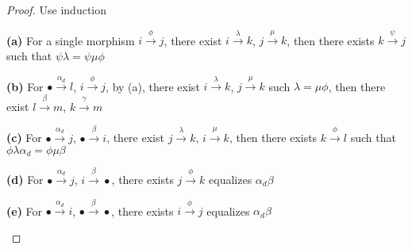 \documentclass[../main.tex]{subfiles}
\begin{document}
\begin{proof}
Use induction \par
\textbf{(a) }For a single morphism $i\xrightarrow{\phi}j$, there exist $i\xrightarrow{\lambda}k$, $j\xrightarrow{\mu}k$, then there exists $k\xrightarrow{\psi}j$ such that $\psi\lambda=\psi\mu\phi$
\begin{center}
\end{center}
\textbf{(b) }For $\bullet\xrightarrow{\alpha_d}l$, $i\xrightarrow{\phi}j$, by (a), there exist $i\xrightarrow{\lambda}k$, $j\xrightarrow{\mu}k$ such $\lambda=\mu\phi$, then there exist $l\xrightarrow{\beta}m$, $k\xrightarrow{\gamma}m$
\begin{center}
\end{center}
\textbf{(c) }For $\bullet\xrightarrow{\alpha_d}j$, $\bullet\xrightarrow{\beta}i$, there exist $j\xrightarrow{\lambda}k$, $i\xrightarrow{\mu}k$, then there exists $k\xrightarrow{\phi}l$ such that $\phi\lambda\alpha_d=\phi\mu\beta$
\begin{center}
\end{center}
\textbf{(d) }For $\bullet\xrightarrow{\alpha_d}j$, $i\xrightarrow{\beta}\bullet$, there exists $j\xrightarrow{\phi}k$ equalizes $\alpha_d\beta$
\begin{center}
\end{center}
\textbf{(e) }For $\bullet\xrightarrow{\alpha_d}i$, $\bullet\xrightarrow{\beta}\bullet$, there exists $i\xrightarrow{\phi}j$ equalizes $\alpha_d\beta$
\begin{center}
\end{center}
\end{proof}
\end{document}
